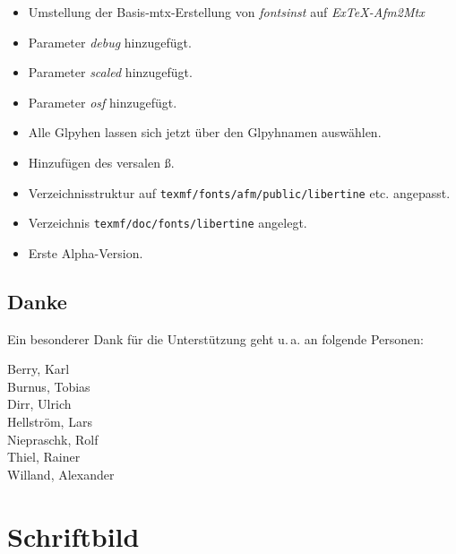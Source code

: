 \documentclass{fontdokuold}
\begin{document}
\begin{description}
\begin{itemize}
\end{itemize}
\item [11. Juni 2007]
\begin{itemize}
\item Umstellung der Basis-mtx-Erstellung von \emph{fontsinst} auf \emph{ExTeX-Afm2Mtx}
\item Parameter \emph{debug} hinzugefügt.
\item Parameter \emph{scaled} hinzugefügt.
\item Parameter \emph{osf} hinzugefügt.
\item Alle Glpyhen lassen sich jetzt über den Glpyhnamen auswählen.
\item Hinzufügen des versalen ß.
\item Verzeichnisstruktur auf \texttt{texmf/fonts/afm/public/libertine} etc. angepasst.
\item Verzeichnis \texttt{texmf/doc/fonts/libertine} angelegt.
\end{itemize}
\item[1. Mai 2007]
\begin{itemize}
\item Erste Alpha-Version.
\end{itemize}
\end{description}

\section{Danke}

Ein besonderer Dank für die Unterstützung geht u.\,a. an folgende Personen:

\begin{multicols}{2}
Berry, Karl\\
Burnus, Tobias\\
Dirr, Ulrich\\
Hellström, Lars\\
Niepraschk, Rolf\\
Thiel, Rainer\\
Willand, Alexander\\
\end{multicols}












\chapter{Schriftbild}
\end{document}
